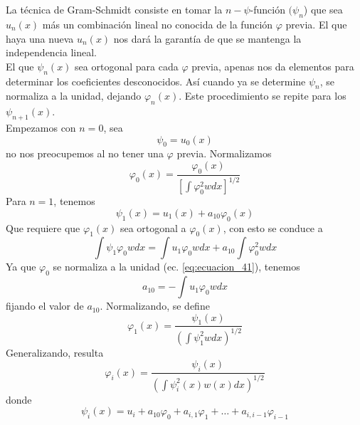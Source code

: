 \\
\\
La técnica de Gram-Schmidt consiste en tomar la $n-\psi$-función $(\psi_{n}$) que sea $u_{n}(x)$ más un combinación lineal no conocida de la función $\varphi$ previa. El que haya una nueva $u_{n}(x)$ nos dará la garantía de que se mantenga la independencia lineal.
\\
El que $\psi_{n}(x)$ sea ortogonal para cada $\varphi$ previa, apenas nos da elementos para determinar los coeficientes desconocidos. Así cuando ya se determine $\psi_{n}$, se normaliza a la unidad, dejando $\varphi_{n}(x)$. Este procedimiento se repite para los $\psi_{n+1}(x)$.
\\
Empezamos con $n=0$, sea
\begin{equation}
\psi_{0} = u_{0}(x)
\label{eq:ecuacion_40}
\end{equation}
no nos preocupemos al no tener una $\varphi$ previa. Normalizamos
\begin{equation}
\varphi_{0}(x) = \dfrac{\varphi_{0}(x)}{\left[ \int \varphi_{0}^{2} w dx \right]^{1/2}}
\label{eq:ecuacion_41}
\end{equation}
Para $n=1$, tenemos
\begin{equation}
\psi_{1}(x) = u_{1}(x) + a_{10} \varphi_{0}(x)
\label{eq:ecuacion_42}
\end{equation}
Que requiere que $\varphi_{1}(x)$ sea ortogonal a $\varphi_{0}(x)$, con esto se conduce a
\begin{equation}
\int \psi_{1} \varphi_{0} w dx = \int u_{1} \varphi_{0} w dx + a_{10} \int \varphi_{0}^{2} w dx
\label{eq:ecuacion_43}
\end{equation}
Ya que $\varphi_{0}$ se normaliza a la unidad (ec. \ref{eq:ecuacion_41}), tenemos
\begin{equation}
a_{10} = - \int	u_{1} \varphi_{0} w dx
\label{eq:ecuacion_44}
\end{equation}
fijando el valor de $a_{10}$. Normalizando, se define
\begin{equation}
\varphi_{1} (x) = \dfrac{\psi_{1}(x)}{\left( \int \psi_{1}^{2} w dx \right)^{1/2}}
\label{eq:ecuacion_45}
\end{equation}
Generalizando, resulta
\begin{equation}
\varphi_{i}(x) = \dfrac{\psi_{i}(x)}{\left( \int \psi_{i}^{2}(x) w(x) dx \right)^{1/2}}
\label{eq:ecuacion_46}
\end{equation}
donde
\begin{equation}
\psi_{i}(x) = u_{i} + a_{10} \varphi_{0} + a_{i,1} \varphi_{1} + \ldots + a_{i,i-1} \varphi_{i-1}
\label{eq:ecuacion_47}
\end{equation}
